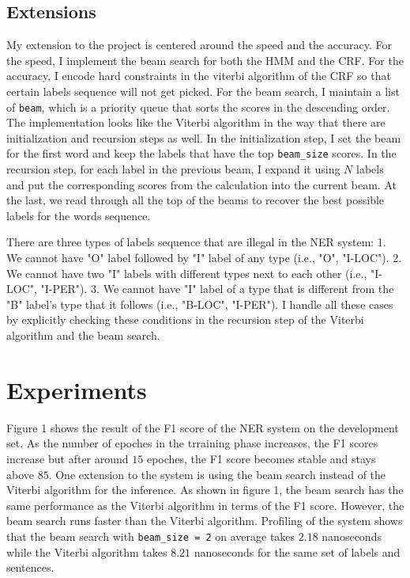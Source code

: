 \documentclass[11pt,a4paper]{article}
\begin{document}
\subsection{Extensions}

My extension to the project is centered around the speed and the accuracy. 
For the speed, I implement the beam search for both the HMM and the CRF. 
For the accuracy, I encode hard constraints in the viterbi algorithm of the CRF
so that certain labels sequence will not get picked.
For the beam search, I maintain a list of \verb|beam|, which is a priority queue
that sorts the scores in the descending order. The implementation looks like
the Viterbi algorithm in the way that there are initialization and recursion steps as well. 
In the initialization
step, I set the beam for the first word and keep the labels that have the top \verb|beam_size|
scores. In the recursion step, for each label in the previous beam, I expand it
using $N$ labels and put the corresponding scores from the calculation 
into the current beam. At the last, we read through all the top of the beams to recover 
the best possible labels for the words sequence.

There are three types of labels sequence that are illegal in the NER system: 
1. We cannot have "O" label followed
by "I" label of any type (i.e., "O", "I-LOC"). 2. We cannot have two "I" labels with different
types next to each other (i.e., "I-LOC", "I-PER"). 3. We cannot have "I" label of a type that
is different from the "B" label's type that it follows (i.e., "B-LOC", "I-PER"). I handle all these
cases by explicitly checking these conditions in the recursion step of the Viterbi algorithm and
the beam search.

\section{Experiments}

Figure 1 shows the result of the F1 score of the NER system on the development set.
As the number of epoches in the trraining phase increases, the F1 scores increase 
but after around $15$ epoches, the F1 score becomes stable and stays above $85$. One extension to the system
is using the beam search instead of the Viterbi algorithm for the inference.
As shown in figure 1, the beam search has the same performance as the Viterbi algorithm
in terms of the F1 score. However, the beam search runs faster than the Viterbi algorithm.
Profiling of the system shows that 
the beam search with \verb|beam_size = 2| on average takes $2.18$ nanoseconds 
while the Viterbi algorithm takes $8.21$ nanoseconds for the same set of labels 
and sentences. 
\end{document}
